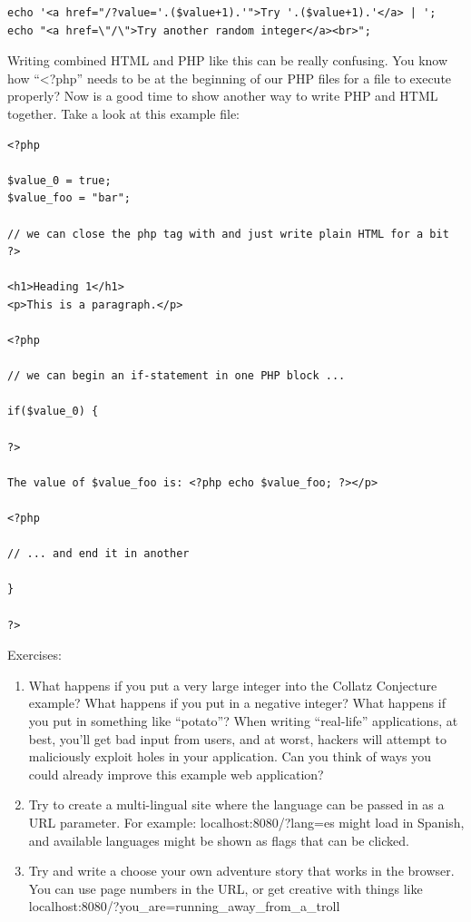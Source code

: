 \documentclass[
]{book}
\begin{document}
\begin{verbatim}
echo '<a href="/?value='.($value+1).'">Try '.($value+1).'</a> | ';
echo "<a href=\"/\">Try another random integer</a><br>";
\end{verbatim}

Writing combined HTML and PHP like this can be really confusing. You know how ``\textless?php'' needs to be at the beginning of our PHP files for a file to execute properly? Now is a good time to show another way to write PHP and HTML together. Take a look at this example file:

\begin{verbatim}
<?php

$value_0 = true;
$value_foo = "bar";

// we can close the php tag with and just write plain HTML for a bit
?>

<h1>Heading 1</h1>
<p>This is a paragraph.</p>

<?php 

// we can begin an if-statement in one PHP block ...

if($value_0) { 

?>

The value of $value_foo is: <?php echo $value_foo; ?></p>

<?php 

// ... and end it in another

} 

?>
\end{verbatim}

Exercises:

\begin{enumerate}
\def\labelenumi{\arabic{enumi}.}
\item
  What happens if you put a very large integer into the Collatz Conjecture example? What happens if you put in a negative integer? What happens if you put in something like ``potato''? When writing ``real-life'' applications, at best, you'll get bad input from users, and at worst, hackers will attempt to maliciously exploit holes in your application. Can you think of ways you could already improve this example web application?
\item
  Try to create a multi-lingual site where the language can be passed in as a URL parameter. For example: localhost:8080/?lang=es might load in Spanish, and available languages might be shown as flags that can be clicked.
\item
  Try and write a choose your own adventure story that works in the browser. You can use page numbers in the URL, or get creative with things like localhost:8080/?you\_are=running\_away\_from\_a\_troll
\end{enumerate}
\end{document}
